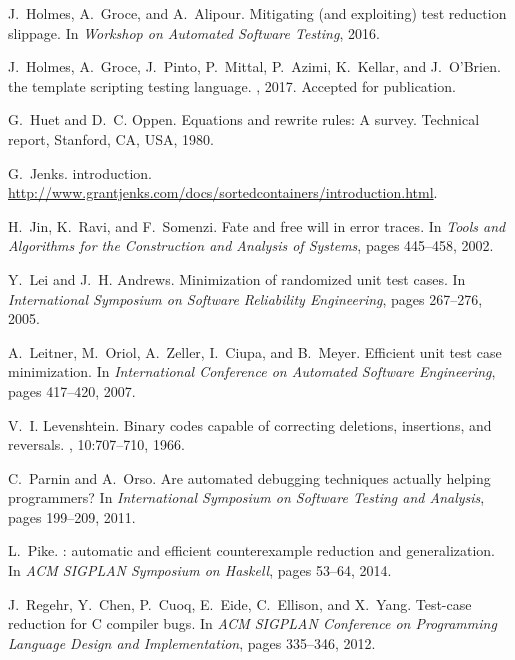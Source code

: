 \documentclass[format=sigconf]{acmart}
\begin{document}
\begin{thebibliography}{10}
J.~Holmes, A.~Groce, and A.~Alipour.
\newblock Mitigating (and exploiting) test reduction slippage.
\newblock In {\em Workshop on Automated Software Testing}, 2016.

J.~Holmes, A.~Groce, J.~Pinto, P.~Mittal, P.~Azimi, K.~Kellar, and J.~O'Brien.
 the template scripting testing language.
, 2017.
\newblock Accepted for publication.

G.~Huet and D.~C. Oppen.
\newblock Equations and rewrite rules: A survey.
\newblock Technical report, Stanford, CA, USA, 1980.

G.~Jenks.
 introduction.
\newblock
  \url{http://www.grantjenks.com/docs/sortedcontainers/introduction.html}.

H.~Jin, K.~Ravi, and F.~Somenzi.
\newblock Fate and free will in error traces.
\newblock In {\em Tools and Algorithms for the Construction and Analysis of
  Systems}, pages 445--458, 2002.

Y.~Lei and J.~H. Andrews.
\newblock Minimization of randomized unit test cases.
\newblock In {\em International Symposium on Software Reliability Engineering},
  pages 267--276, 2005.

A.~Leitner, M.~Oriol, A.~Zeller, I.~Ciupa, and B.~Meyer.
\newblock Efficient unit test case minimization.
\newblock In {\em International Conference on Automated Software Engineering},
  pages 417--420, 2007.

V.~I. Levenshtein.
\newblock Binary codes capable of correcting deletions, insertions, and
  reversals.
, 10:707--710, 1966.

C.~Parnin and A.~Orso.
\newblock Are automated debugging techniques actually helping programmers?
\newblock In {\em International Symposium on Software Testing and Analysis},
  pages 199--209, 2011.

L.~Pike.
: automatic and efficient counterexample reduction and
  generalization.
\newblock In {\em {ACM} {SIGPLAN} Symposium on Haskell}, pages 53--64, 2014.

J.~Regehr, Y.~Chen, P.~Cuoq, E.~Eide, C.~Ellison, and X.~Yang.
\newblock Test-case reduction for {C} compiler bugs.
\newblock In {\em ACM SIGPLAN Conference on Programming Language Design and
  Implementation}, pages 335--346, 2012.


\end{thebibliography}
\end{document}
